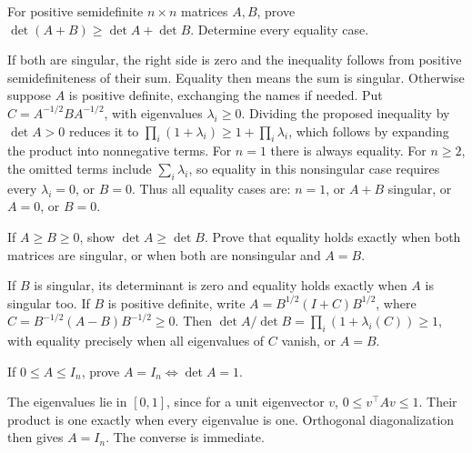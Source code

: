 \begin{problem}\label{ex:12:ineq-ma-07}
For positive semidefinite \(n\times n\) matrices \(A,B\), prove
\(\det(A+B)\geqslant\det A+\det B\). Determine every equality case.
\end{problem}
\begin{solution}
If both are singular, the right side is zero and the inequality follows
from positive semidefiniteness of their sum. Equality then means the sum
is singular. Otherwise suppose \(A\) is positive definite, exchanging
the names if needed. Put \(C=A^{-1/2}BA^{-1/2}\), with eigenvalues
\(\lambda_i\geqslant0\). Dividing the proposed inequality by \(\det A>0\)
reduces it to
\(\prod_i(1+\lambda_i)\geqslant1+\prod_i\lambda_i\),
which follows by expanding the product into nonnegative terms.
For \(n=1\) there is always equality. For \(n\geqslant2\), the omitted
terms include \(\sum_i\lambda_i\), so equality in this nonsingular case
requires every \(\lambda_i=0\), or \(B=0\).
Thus all equality cases are: \(n=1\), or \(A+B\) singular, or \(A=0\),
or \(B=0\).
\end{solution}

\begin{problem}\label{ex:12:ineq-ma-08}
If \(A\geqslant B\geqslant0\), show \(\det A\geqslant\det B\).
Prove that equality holds exactly when both matrices are singular, or
when both are nonsingular and \(A=B\).
\end{problem}
\begin{solution}
If \(B\) is singular, its determinant is zero and equality holds exactly
when \(A\) is singular too. If \(B\) is positive definite, write
\(A=B^{1/2}(I+C)B^{1/2}\), where
\(C=B^{-1/2}(A-B)B^{-1/2}\geqslant0\).
Then \(\det A/\det B=\prod_i(1+\lambda_i(C))\geqslant1\),
with equality precisely when all eigenvalues of \(C\) vanish, or \(A=B\).
\end{solution}

\begin{problem}\label{ex:12:ineq-ma-09}
If \(0\leqslant A\leqslant I_n\), prove \(A=I_n\iff\det A=1\).
\end{problem}
\begin{solution}
The eigenvalues lie in \([0,1]\), since for a unit eigenvector \(v\),
\(0\leqslant v^\top Av\leqslant1\). Their product is one exactly
when every eigenvalue is one. Orthogonal diagonalization then gives
\(A=I_n\). The converse is immediate.
\end{solution}

